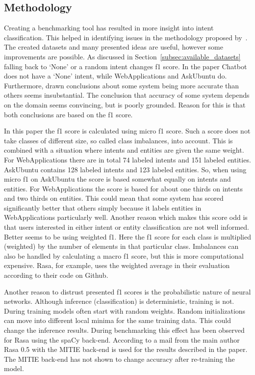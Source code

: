 \subsection{Methodology}
\label{subsec:methodology}
Creating a benchmarking tool has resulted in more insight into intent classification.
This helped in identifying issues in the methodology proposed by~\citet{braun2017}.
The created datasets and many presented ideas are useful, however some improvements are possible.
As discussed in Section~\ref{subsec:available_datasets} falling back to `None' or a random intent changes f1 score.
In the paper Chatbot does not have a `None' intent, while WebApplications and AskUbuntu do.
Furthermore, drawn conclusions about some system being more accurate than others seems insubstantial.
The conclusion that accuracy of some system depends on the domain seems convincing, but is poorly grounded.
Reason for this is that both conclusions are based on the f1 score.

In this paper the f1 score is calculated using micro f1 score.
Such a score does not take classes of different size, so called class imbalances, into account.
This is combined with a situation where intents and entities are given the same weight.
For WebApplications there are in total 74 labeled intents and 151 labeled entities.
AskUbuntu contains 128 labeled intents and 123 labeled entities.
So, when using micro f1 on AskUbuntu the score is based somewhat equally on intents and entities.
For WebApplications the score is based for about one thirds on intents and two thirds on entities.
This could mean that some system has scored significantly better that others simply because it labels entities in WebApplications particularly well.
Another reason which makes this score odd is that users interested in either intent or entity classification are not well informed.
Better seems to be using weighted f1.
Here the f1 score for each class is multiplied (weighted) by the number of elements in that particular class.
Imbalances can also be handled by calculating a macro f1 score, but this is more computational expensive.
Rasa, for example, uses the weighted average in their evaluation according to their code on Github.

Another reason to distrust presented f1 scores is the probabilistic nature of neural networks.
Although inference (classification) is deterministic, training is not.
During training models often start with random weights.
Random initializations can move into different local minima for the same training data.
This could change the inference results.
During benchmarking this effect has been observed for Rasa using the spaCy back-end.
According to a mail from the main author Rasa 0.5 with the MITIE back-end is used for the results described in the paper.
The MITIE back-end has not shown to change accuracy after re-training the model.
